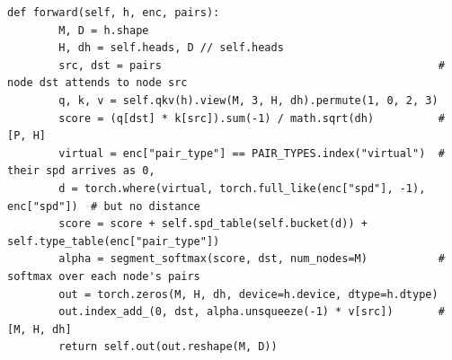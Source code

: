 \begin{lstlisting}[style=p1py]
    def forward(self, h, enc, pairs):
        M, D = h.shape
        H, dh = self.heads, D // self.heads
        src, dst = pairs                                           # node dst attends to node src
        q, k, v = self.qkv(h).view(M, 3, H, dh).permute(1, 0, 2, 3)
        score = (q[dst] * k[src]).sum(-1) / math.sqrt(dh)          # [P, H]
        virtual = enc["pair_type"] == PAIR_TYPES.index("virtual")  # their spd arrives as 0,
        d = torch.where(virtual, torch.full_like(enc["spd"], -1), enc["spd"])  # but no distance
        score = score + self.spd_table(self.bucket(d)) + self.type_table(enc["pair_type"])
        alpha = segment_softmax(score, dst, num_nodes=M)           # softmax over each node's pairs
        out = torch.zeros(M, H, dh, device=h.device, dtype=h.dtype)
        out.index_add_(0, dst, alpha.unsqueeze(-1) * v[src])       # [M, H, dh]
        return self.out(out.reshape(M, D))
\end{lstlisting}
